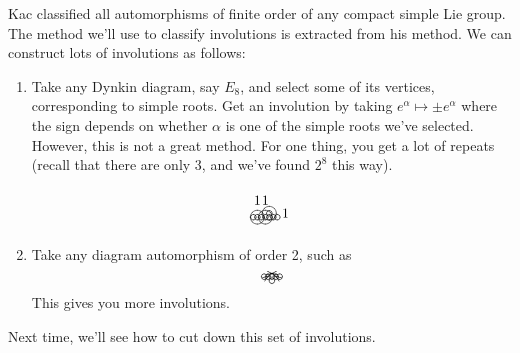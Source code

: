  Kac classified all automorphisms of finite order of any compact simple Lie group. The
 method we'll use to classify involutions is extracted from his method. We can
 construct lots of involutions as follows:
 \begin{enumerate}
 \item Take any Dynkin diagram, say $E_8$, and select some of its vertices,
 corresponding to simple roots. Get an involution by taking $e^\alpha\mapsto \pm
 e^\alpha$ where the sign depends on whether $\alpha$ is one of the simple roots we've
 selected. However, this is not a great method. For one thing, you get a lot of
 repeats (recall that there are only 3, and we've found $2^8$ this way).
 \[
 \begin{xy}
   (0,0) *\cir<2pt>{};
   p+(1,0)="a" *\cir<2pt>{} **@{-};
   p+(1,0) *\cir<2pt>{} **@{-};
   p+(1,0)="b" *\cir<2pt>{} **@{-};
   p+(1,0) *\cir<2pt>{} **@{-};
   p+(0,1)="c" *\cir<2pt>{} **@{-},
   p+(1,0) *\cir<2pt>{} **@{-};
   p+(1,0) *\cir<2pt>{} **@{-};
   "a" *\cir<5pt>{} *+++!D{1};
   "b" *\cir<5pt>{} *+++!D{1};
   "c" *\cir<5pt>{} *+++!L{1};
 \end{xy}
 \]
 \item Take any diagram automorphism of order 2, such as
 \[\begin{xy}
   (0,0)="1" *\cir<2pt>{};
   (1,0)="2"  *\cir<2pt>{} **@{-};
   p+(1,0) *\cir<2pt>{} **@{-};
   p+(0,-1) *\cir<2pt>{} **@{-},
   p+(1,0)="22" *\cir<2pt>{} **@{-};
   p+(1,0)="11" *\cir<2pt>{} **@{-};
   "1" *+{\ };"11" *+{\ } **\crv{(2,1.5)} ?<*@{<} ?>*@{>},
   "2" *+{\ };"22" *+{\ } **\crv{(2,1)} ?<*@{<} ?>*@{>},
 \end{xy}\]
 This gives you more involutions.
 \end{enumerate}

 Next time, we'll see how to cut down this set of involutions.
